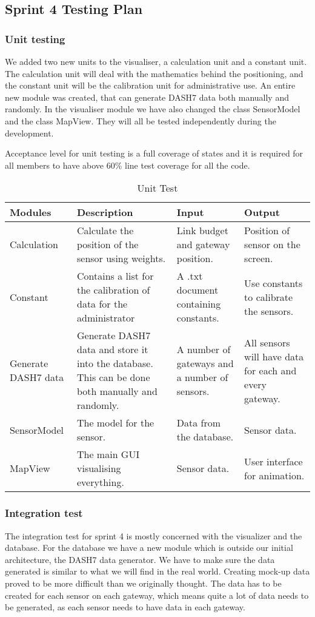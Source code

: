 \documentclass[../document]{subfiles}
\begin{document}
\subsection{Sprint 4 Testing Plan}
\label{test_plan_sprint_4}

\subsubsection{Unit testing}
We added two new units to the visualiser, a calculation unit and a constant unit. The calculation unit will deal with the mathematics behind the positioning, and the constant unit will be the calibration unit for administrative use. An entire new module was created, that can generate \gls{DASH7} data both manually and randomly. In the visualiser module we have also changed the class SensorModel and the class MapView. They will all be tested independently during the development. 

Acceptance level for unit testing is a full coverage of states and it is required for all members to have above 60\% line test coverage for all the code.

\begin{table}[H]
\caption{Unit Test}
\centering
\begin{tabularx}{\textwidth}{|X|X|X|X|}
	\hline
	Modules
	&Description
	&Input
	&Output
	\\ \hline Calculation
	&Calculate the position of the sensor using weights.
	&Link budget and gateway position.
	&Position of sensor on the screen.
	\\ \hline Constant
	&Contains a list for the calibration of data for the administrator
	&A .txt document containing constants.
	&Use constants to calibrate the sensors.
	\\ \hline Generate \gls{DASH7} data
	&Generate \gls{DASH7} data and store it into the database. This can be done both manually and randomly. 
	&A number of gateways and a number of sensors.
	&All sensors will have data for each and every gateway.
	\\ \hline SensorModel
	&The model for the sensor.
	&Data from the database.
	&Sensor data.
	\\ \hline MapView
	&The main GUI visualising everything.
	&Sensor data.
	&User interface for animation.
	\\ \hline 
\end{tabularx}
\end{table}

\subsubsection{Integration test}
The integration test for sprint 4 is mostly concerned with the visualizer and the database. For the database we have a new module which is outside our initial architecture, the \gls{DASH7} data generator. We have to make sure the data generated is similar to what we will find in the real world. Creating mock-up data proved to be more difficult than we originally thought. The data has to be created for each sensor on each gateway, which means quite a lot of data needs to be generated, as each sensor needs to have data in each gateway. 
\end{document}
